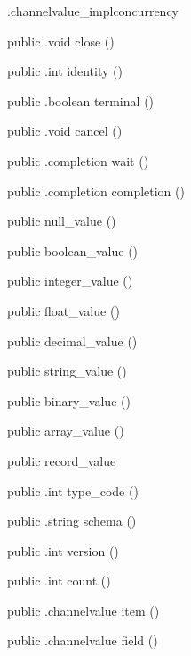 \begin{CrexxClass}{.channelvalue\_impl}{concurrency}
\begin{Members}
    \Method
      {public}
      {.void}
      {close}
      {()}

    \Method
      {public}
      {.int}
      {identity}
      {()}

    \Method
      {public}
      {.boolean}
      {terminal}
      {()}

    \Method
      {public}
      {.void}
      {cancel}
      {()}

    \Method
      {public}
      {.completion}
      {wait}
      {()}

    \Method
      {public}
      {.completion}
      {completion}
      {()}

    \Factory
      {public}
      {null\_value}
      {()}

    \Factory
      {public}
      {boolean\_value}
      {()}

    \Factory
      {public}
      {integer\_value}
      {()}

    \Factory
      {public}
      {float\_value}
      {()}

    \Factory
      {public}
      {decimal\_value}
      {()}

    \Factory
      {public}
      {string\_value}
      {()}

    \Factory
      {public}
      {binary\_value}
      {()}

    \Factory
      {public}
      {array\_value}
      {()}

    \Factory
      {public}
      {record\_value}
      {}

    \Method
      {public}
      {.int}
      {type\_code}
      {()}

    \Method
      {public}
      {.string}
      {schema}
      {()}

    \Method
      {public}
      {.int}
      {version}
      {()}

    \Method
      {public}
      {.int}
      {count}
      {()}

    \Method
      {public}
      {.channelvalue}
      {item}
      {()}

    \Method
      {public}
      {.channelvalue}
      {field}
      {()}


\end{Members}
\end{CrexxClass}
